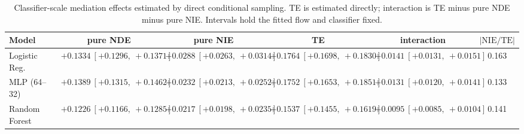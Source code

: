 \begin{table}[htbp]
  \centering
  \caption{Classifier-scale mediation effects estimated by direct conditional sampling. TE is estimated directly; interaction is TE minus pure NDE minus pure NIE. Intervals hold the fitted flow and classifier fixed.}
  \label{tab:adult_gap_overall}
  \begin{tabular}{lccccc}
    \toprule
    Model & pure NDE & pure NIE & TE & interaction & $|\mathrm{NIE}/\mathrm{TE}|$ \\
    \midrule
    Logistic Reg. & $+0.1334\ [+0.1296,\ +0.1371]$ & $+0.0288\ [+0.0263,\ +0.0314]$ & $+0.1764\ [+0.1698,\ +0.1830]$ & $+0.0141\ [+0.0131,\ +0.0151]$ & 0.163 \\
    MLP (64--32) & $+0.1389\ [+0.1315,\ +0.1462]$ & $+0.0232\ [+0.0213,\ +0.0252]$ & $+0.1752\ [+0.1653,\ +0.1851]$ & $+0.0131\ [+0.0120,\ +0.0141]$ & 0.133 \\
    Random Forest & $+0.1226\ [+0.1166,\ +0.1285]$ & $+0.0217\ [+0.0198,\ +0.0235]$ & $+0.1537\ [+0.1455,\ +0.1619]$ & $+0.0095\ [+0.0085,\ +0.0104]$ & 0.141 \\
    \bottomrule
  \end{tabular}
\end{table}